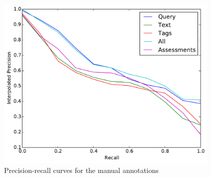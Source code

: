 \begin{figure}[htb]
    \centering
    \includegraphics[width=0.95\textwidth]{graphs/manual-result}
    \caption{Precision-recall curves for the manual annotations}
    \label{fig:manual-result}
\end{figure}

